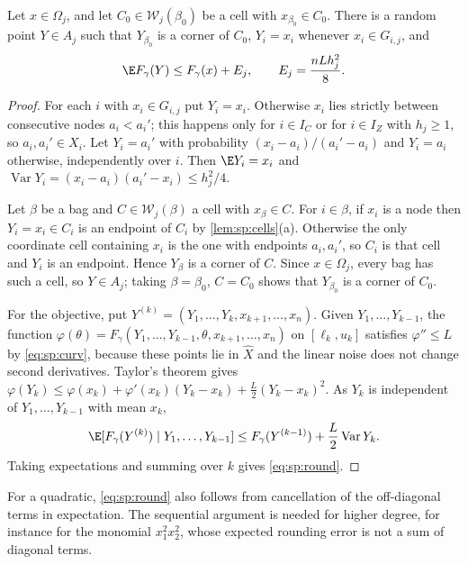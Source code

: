 \begin{lemma}\label{lem:sp:round}
Let $x\in\Omega_j$, and let $C_0\in\mathcal W_j(\beta_0)$ be a cell with
$x_{\beta_0}\in C_0$. There is a random point $Y\in A_j$ such that
$Y_{\beta_0}$ is a corner of $C_0$, $Y_i=x_i$ whenever $x_i\in G_{i,j}$, and
\begin{equation}\label{eq:sp:round}
 \E F_\gamma(Y)\le F_\gamma(x)+E_j,\qquad E_j=\frac{nLh_j^2}{8}.
\end{equation}
\end{lemma}

\begin{proof}
For each $i$ with $x_i\in G_{i,j}$ put $Y_i=x_i$. Otherwise $x_i$ lies
strictly between consecutive nodes $a_i<a_i'$; this happens only for
$i\in I_C$ or for $i\in I_Z$ with $h_j\ge1$, so $a_i,a_i'\in X_i$. Let
$Y_i=a_i'$ with probability $(x_i-a_i)/(a_i'-a_i)$ and $Y_i=a_i$ otherwise,
independently over $i$. Then $\E Y_i=x_i$ and
$\operatorname{Var}Y_i=(x_i-a_i)(a_i'-x_i)\le h_j^2/4$.

Let $\beta$ be a bag and $C\in\mathcal W_j(\beta)$ a cell with $x_\beta\in
C$. For $i\in\beta$, if $x_i$ is a node then $Y_i=x_i\in C_i$ is an endpoint
of $C_i$ by \cref{lem:sp:cells}(a). Otherwise the only coordinate cell
containing $x_i$ is the one with endpoints $a_i,a_i'$, so $C_i$ is that cell
and $Y_i$ is an endpoint. Hence $Y_\beta$ is a corner of $C$. Since
$x\in\Omega_j$, every bag has such a cell, so $Y\in A_j$; taking
$\beta=\beta_0$, $C=C_0$ shows that $Y_{\beta_0}$ is a corner of $C_0$.

For the objective, put $Y^{(k)}=(Y_1,\dots,Y_k,x_{k+1},\dots,x_n)$. Given
$Y_1,\dots,Y_{k-1}$, the function
$\varphi(\theta)=F_\gamma(Y_1,\dots,Y_{k-1},\theta,x_{k+1},\dots,x_n)$ on
$[\ell_k,u_k]$ satisfies $\varphi''\le L$ by \eqref{eq:sp:curv}, because
these points lie in $\widehat X$ and the linear noise does not change second
derivatives. Taylor's theorem gives
$\varphi(Y_k)\le\varphi(x_k)+\varphi'(x_k)(Y_k-x_k)+\frac L2(Y_k-x_k)^2$.
As $Y_k$ is independent of $Y_1,\dots,Y_{k-1}$ with mean $x_k$,
\[
 \E[F_\gamma(Y^{(k)})\mid Y_1,\dots,Y_{k-1}]\le F_\gamma(Y^{(k-1)})
 +\frac L2\operatorname{Var}Y_k .
\]
Taking expectations and summing over $k$ gives \eqref{eq:sp:round}.
\end{proof}

For a quadratic, \eqref{eq:sp:round} also follows from cancellation of the
off-diagonal terms in expectation. The sequential argument is needed for
higher degree, for instance for the monomial $x_1^2x_2^2$, whose expected
rounding error is not a sum of diagonal terms.

